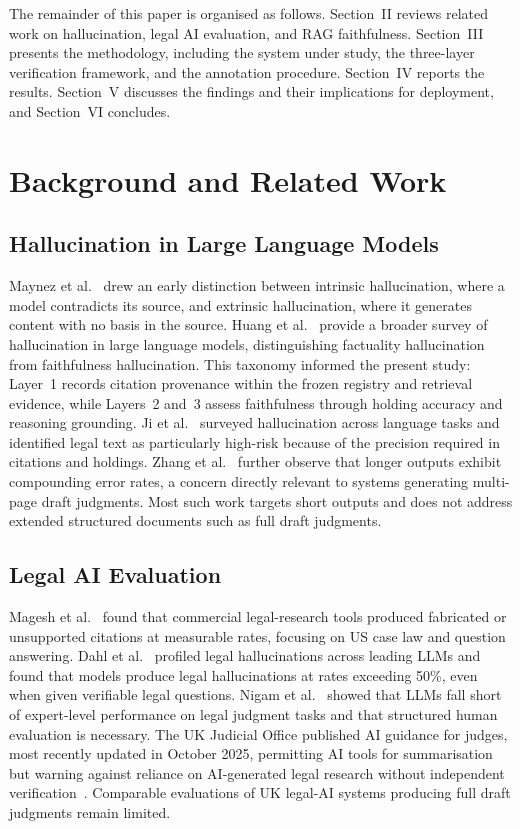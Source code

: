 \documentclass[conference]{IEEEtran}
\begin{document}
The remainder of this paper is organised as follows. Section~II reviews related work on hallucination, legal AI evaluation, and RAG faithfulness. Section~III presents the methodology, including the system under study, the three-layer verification framework, and the annotation procedure. Section~IV reports the results. Section~V discusses the findings and their implications for deployment, and Section~VI concludes.

\section{Background and Related Work}

\subsection{Hallucination in Large Language Models}

Maynez et al.~\cite{maynez2020} drew an early distinction between intrinsic hallucination, where a model contradicts its source, and extrinsic hallucination, where it generates content with no basis in the source. Huang et al.~\cite{huang2023} provide a broader survey of hallucination in large language models, distinguishing factuality hallucination from faithfulness hallucination. This taxonomy informed the present study: Layer~1 records citation provenance within the frozen registry and retrieval evidence, while Layers~2 and~3 assess faithfulness through holding accuracy and reasoning grounding. Ji et al.~\cite{ji2023} surveyed hallucination across language tasks and identified legal text as particularly high-risk because of the precision required in citations and holdings. Zhang et al.~\cite{zhang2023} further observe that longer outputs exhibit compounding error rates, a concern directly relevant to systems generating multi-page draft judgments. Most such work targets short outputs and does not address extended structured documents such as full draft judgments.

\subsection{Legal AI Evaluation}

Magesh et al.~\cite{magesh2024} found that commercial legal-research tools produced fabricated or unsupported citations at measurable rates, focusing on US case law and question answering. Dahl et al.~\cite{dahl2024} profiled legal hallucinations across leading LLMs and found that models produce legal hallucinations at rates exceeding 50\%, even when given verifiable legal questions. Nigam et al.~\cite{nigam2024} showed that LLMs fall short of expert-level performance on legal judgment tasks and that structured human evaluation is necessary. The UK Judicial Office published AI guidance for judges, most recently updated in October 2025, permitting AI tools for summarisation but warning against reliance on AI-generated legal research without independent verification~\cite{ukjudicial2025}. Comparable evaluations of UK legal-AI systems producing full draft judgments remain limited.
\end{document}
